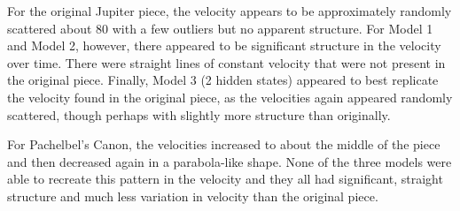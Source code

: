 \documentclass{article} %
\begin{document}
For the original Jupiter piece, the velocity appears to be approximately randomly scattered about 80 with a few outliers but no apparent structure.  For Model 1 and Model 2, however, there appeared to be significant structure in the velocity over time. There were straight lines of constant velocity that were not present in the original piece.  Finally, Model 3 (2 hidden states) appeared to best replicate the velocity found in the original piece, as the velocities again appeared randomly scattered, though perhaps with slightly more structure than originally.

For Pachelbel's Canon, the velocities increased to about the middle of the piece and then decreased again in a parabola-like shape.  None of the three models were able to recreate this pattern in the velocity and they all had significant, straight structure and much less variation in velocity than the original piece.
\end{document}
